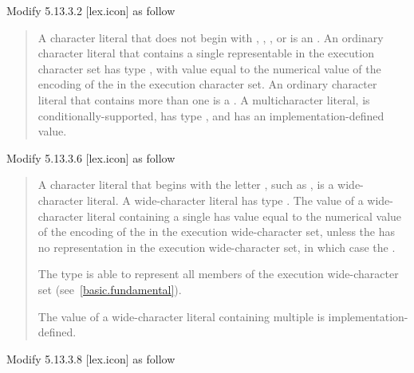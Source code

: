 \documentclass{wg21}
\begin{document}
Modify 5.13.3.2 [lex.icon] as follow

\begin{quote}
A character literal that does not begin with
, , , or 
is an .
An ordinary character literal that contains a
single  representable in the execution character
set has type , with value equal to the
numerical value of the encoding of the  in the
execution character set. 
An ordinary character literal that contains more than one  is a
.
A multicharacter literal, is conditionally-supported, has type ,
and has an implementation-defined value.

\end{quote}

Modify 5.13.3.6 [lex.icon] as follow

\begin{quote}
\pnum
A character literal that
begins with the letter , such as , is a wide-character literal. A wide-character literal has type
.
The value of a wide-character literal containing a single
 has value equal to the numerical value of the encoding
of the  in the execution wide-character set, unless the
 has no representation in the execution wide-character set, in which
case the . \begin{note} The type  is able to
	represent all members of the execution wide-character set (see~\ref{basic.fundamental}).
\end{note} 
The value of a wide-character literal containing multiple  is implementation-defined.

\end{quote}

Modify 5.13.3.8 [lex.icon] as follow
\end{document}
